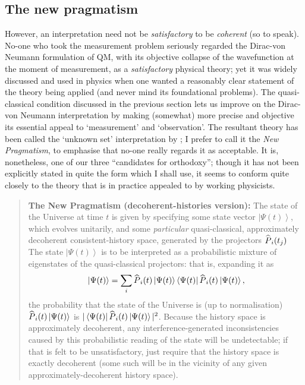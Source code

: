 \documentclass[12pt]{article}
\newcommand{\be}{\begin{equation}}
\newcommand{\ee}{\end{equation}}
\newcommand{\ket}[1]{\ensuremath{\left|  #1 \right\rangle}}
\newcommand{\bra}[1]{\ensuremath{\left\langle #1 \right|}}
\newcommand{\matel}[3]{\ensuremath{\bra{#1} #2 \ket{#3}}}
\newcommand{\op}[1]{\ensuremath{\widehat{\textsf{\ensuremath{#1}}}}}
\begin{document}
\subsection{The new pragmatism}

However, an interpretation need not be \emph{satisfactory} to be \emph{coherent} (so to speak). No-one who took the measurement problem seriously regarded the Dirac-von Neumann formulation of QM, with its objective collapse of the wavefunction at the moment of measurement, as a \emph{satisfactory} physical theory; yet it was widely discussed and used in physics when one wanted a reasonably clear statement of the theory being applied (and never mind its foundational problems). The quasi-classical condition discussed in the previous section lets us improve on the Dirac-von Neumann interpretation by making (somewhat) more precise and objective its essential appeal to `measurement' and `observation'. The resultant theory has been called the `unknown set' interpretation by ; I prefer to call it the \emph{New Pragmatism}, to emphasise that no-one really regards it as acceptable. It is, nonetheless, one of our three ``candidates for orthodoxy''; though it has not been explicitly stated in quite the form which I shall use, it seems to conform quite closely to the theory that is in practice appealed to by working physicists.

\begin{quote}
\textbf{The New Pragmatism (decoherent-histories version):}
The state of the Universe at time $t$ is given by specifying some state vector \ket{\Psi(t)}, which evolves unitarily, and some 
\emph{particular} quasi-classical, approximately decoherent consistent-history space, generated by
the projectors $\op{P}_i(t_j)$
The state \ket{\Psi(t)} is to be interpreted as a probabilistic mixture of eigenstates of the quasi-classical projectors: that is, expanding it as
\be
\ket{\Psi(t)}=\sum_{i}\op{P}_i(t)\ket{\Psi(t)}\matel{\Psi(t)}{\op{P}_i(t)}{\Psi(t)},
\ee
the probability that the state of the Universe is (up to normalisation) $\op{P}_i(t)\ket{\Psi(t)}$ is 
$|\matel{\Psi(t)}{\op{P}_i(t)}{\Psi(t)}|^2$. Because the history space is approximately decoherent, any interference-generated inconsistencies caused by this probabilistic reading of the state will be undetectable; if that is felt to be unsatisfactory, just require that the history space is exactly decoherent (some such will be in the vicinity of any given approximately-decoherent history space).
\end{quote}
\end{document}
